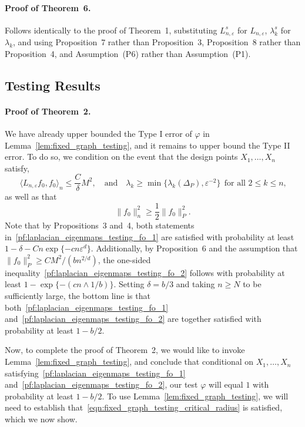 \documentclass[aos]{imsart}
\theoremstyle{plain}
\theoremstyle{definition}
\theoremstyle{remark}
\newcommand{\dotp}[2]{\langle #1, #2 \rangle}
\newcommand{\1}{\mathbf{1}}
\begin{document}
\paragraph{Proof of Theorem~6.}
Follows identically to the proof of Theorem~1, substituting $L_{n,\varepsilon}^s$ for $L_{n,\varepsilon}$, $\lambda_k^s$ for $\lambda_k$, and using Proposition~7 rather than Proposition~3, Proposition~8 rather than Proposition~4, and Assumption~(P6) rather than Assumption~(P1).

\subsection{Testing Results}

\paragraph{Proof of Theorem~2.}
We have already upper bounded the Type I error of $\varphi$ in Lemma~\ref{lem:fixed_graph_testing}, and it remains to upper bound the Type II error. To do so, we condition on the event that the design points $X_1,\ldots,X_n$ satisfy,
\begin{equation}
\label{pf:laplacian_eigenmaps_testing_fo_1}
\dotp{L_{n,\varepsilon}f_0}{f_0}_n \leq \frac{C}{\delta}M^2,\quad \textrm{and} \quad \lambda_k \geq \min\{\lambda_k(\Delta_P), \varepsilon^{-2}\}~~\textrm{for all $2 \leq k \leq n$,}
\end{equation}
as well as that
\begin{equation}
\label{pf:laplacian_eigenmaps_testing_fo_2}
\|f_0\|_n^2 \geq \frac{1}{2}\|f_0\|_P^2.
\end{equation}
Note that by Propositions~3 and~4, both statements in~\eqref{pf:laplacian_eigenmaps_testing_fo_1} are satisfied with probability at least $1 - \delta - Cn\exp\{-cn\varepsilon^d\}$. Additionally, by Proposition~6 and the assumption that $\|f_0\|_P^2 \geq CM^2/(bn^{2/d})$, the one-sided inequality~\eqref{pf:laplacian_eigenmaps_testing_fo_2} follows with probability at least $1 - \exp\{-(cn \wedge 1/b)\}$. Setting $\delta = b/3$ and taking $n \geq N$ to be sufficiently large, the bottom line is that both~\eqref{pf:laplacian_eigenmaps_testing_fo_1} and~\eqref{pf:laplacian_eigenmaps_testing_fo_2} are together satisfied with probability at least $1 - b/2$.

Now, to complete the proof of Theorem~2, we would like to invoke Lemma~\ref{lem:fixed_graph_testing}, and conclude that conditional on $X_1,\ldots,X_n$ satisfying~\eqref{pf:laplacian_eigenmaps_testing_fo_1} and~\eqref{pf:laplacian_eigenmaps_testing_fo_2}, our test $\varphi$ will equal $1$ with probability at least $1 - b/2$. To use Lemma~\ref{lem:fixed_graph_testing}, we will need to establish that~\eqref{eqn:fixed_graph_testing_critical_radius} is satisfied, which we now show. 
\end{document}
